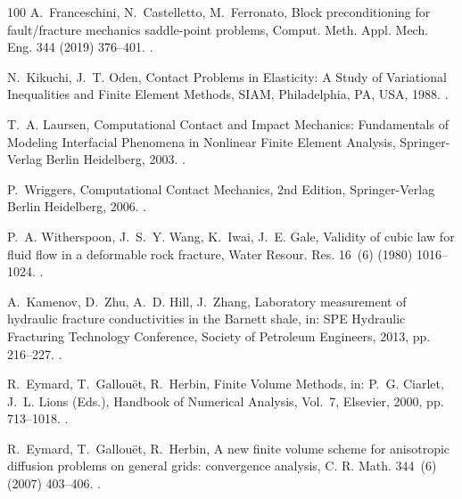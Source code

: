 \documentclass[3p,times]{elsarticle}
\theoremstyle{plain}
\begin{document}
\begin{thebibliography}{100}
A.~Franceschini, N.~Castelletto, M.~Ferronato, Block preconditioning for
  fault/fracture mechanics saddle-point problems, Comput. Meth. Appl. Mech.
  Eng. 344 (2019) 376--401.
\newblock \href {https://doi.org/10.1016/j.cma.2018.09.039}
  {}.

N.~Kikuchi, J.~T. Oden, {Contact Problems in Elasticity: A Study of Variational
  Inequalities and Finite Element Methods}, SIAM, Philadelphia, PA, USA, 1988.
\newblock \href {https://doi.org/10.1137/1.9781611970845}
  {}.

T.~A. Laursen, {Computational Contact and Impact Mechanics: Fundamentals of
  Modeling Interfacial Phenomena in Nonlinear Finite Element Analysis},
  Springer-Verlag Berlin Heidelberg, 2003.
\newblock \href {https://doi.org/10.1007/978-3-662-04864-1}
  {}.

P.~Wriggers, {Computational Contact Mechanics}, 2nd Edition, Springer-Verlag
  Berlin Heidelberg, 2006.
\newblock \href {https://doi.org/10.1007/978-3-540-32609-0}
  {}.

P.~A. Witherspoon, J.~S.~Y. Wang, K.~Iwai, J.~E. Gale, {Validity of cubic law
  for fluid flow in a deformable rock fracture}, Water Resour. Res. 16~(6)
  (1980) 1016--1024.
\newblock \href {https://doi.org/10.1029/WR016i006p01016}
  {}.

A.~Kamenov, D.~Zhu, A.~D. Hill, J.~Zhang, {Laboratory measurement of hydraulic
  fracture conductivities in the Barnett shale}, in: SPE Hydraulic Fracturing
  Technology Conference, Society of Petroleum Engineers, 2013, pp. 216--227.
\newblock \href {https://doi.org/10.2118/163839-ms}
  {}.

R.~Eymard, T.~Gallou\"{e}t, R.~Herbin, {Finite Volume Methods}, in: P.~G.
  Ciarlet, J.~L. Lions (Eds.), {Handbook of Numerical Analysis}, Vol.~7,
  Elsevier, 2000, pp. 713--1018.
\newblock \href {https://doi.org/10.1016/S1570-8659(00)07005-8}
  {}.

R.~Eymard, T.~Gallou\"{e}t, R.~Herbin, A new finite volume scheme for
  anisotropic diffusion problems on general grids: convergence analysis, C. R.
  Math. 344~(6) (2007) 403--406.
\newblock \href {https://doi.org/10.1016/j.crma.2007.01.024}
  {}.


\end{thebibliography}
\end{document}
